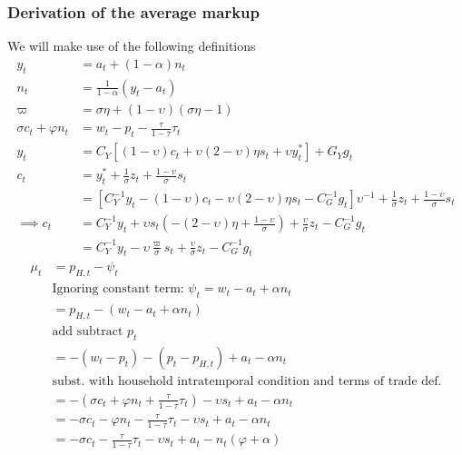 \subsubsection*{Derivation of the average markup}
We will make use of the following definitions
\begin{align}\label{eq:appendix_average_markup_beginning}
    y_t &= a_t + (1-\alpha)n_t\\
    n_t &= \frac{1}{1-\alpha}(y_t - a_t)\\
    \varpi &= \sigma \eta + (1-\upsilon)(\sigma \eta - 1)\\
    \sigma c_t + \varphi n_t &= w_t - p_t - \frac{\tau}{1-\tau}\tau_t\\
    y_t &= C_Y\left[(1-\upsilon)c_t + \upsilon (2-\upsilon)\eta s_t + \upsilon y^*_t\right] + G_Y g_t\\
    c_t &= y_t^* + \frac{1}{\sigma}z_t + \frac{1-\upsilon}{\sigma}s_t\\
    &= \left[C_Y^{-1} y_t -(1-\upsilon)c_t - \upsilon(2-\upsilon)\eta s_t - C^{-1}_G g_t \right]\upsilon^{-1} + \frac{1}{\sigma}z_t + \frac{1-\upsilon}{\sigma}s_t\\
    \implies c_t &= C_Y^{-1} y_t + \upsilon s_t \left( -(2-\upsilon)\eta + \frac{1-\upsilon}{\sigma}\right) + \frac{\upsilon}{\sigma}z_t - C_G^{-1} g_t \\
     &= C_Y^{-1} y_t - \upsilon \frac{\varpi}{\sigma} s_t + \frac{\upsilon}{\sigma}z_t - C_G^{-1} g_t
\end{align}
\begin{align}
    \mu_t &= p_{H,t} - \psi_t \\ 
    &\text{Ignoring constant term: $\psi_t = w_t - a_t + \alpha n_t$} \nonumber\\
    &= p_{H,t} - (w_t - a_t + \alpha n_t)\\
    &\text{add subtract $p_t$} \nonumber\\
    &=-(w_t-p_t) - (p_t - p_{H,t}) + a_t - \alpha n_t \label{eq:appendix_average_markup_add_subtract_p}\\
    &\text{subst. with household intratemporal condition and terms of trade def.} \nonumber\\
    &= -(\sigma c_t + \varphi n_t + \frac{\tau}{1-\tau}\tau_t) - \upsilon s_t + a_t - \alpha n_t\\
    &= -\sigma c_t - \varphi n_t - \frac{\tau}{1-\tau}\tau_t - \upsilon s_t + a_t - \alpha n_t\\
    &= -\sigma c_t - \frac{\tau}{1-\tau}\tau_t - \upsilon s_t + a_t - n_t(\varphi + \alpha)
\end{align}
